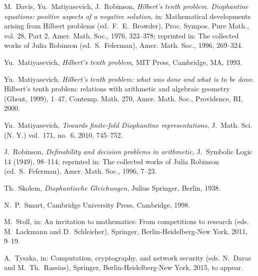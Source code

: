 \documentclass[conference]{IEEEtran}
\begin{document}
\begin{thebibliography}{11}

\mbox{M. Davis}, \mbox{Yu. Matiyasevich}, \mbox{J. Robinson},
\newblock
{\em Hilbert's tenth problem. Diophantine equations: positive aspects of a negative solution,}
in: Mathematical developments arising from Hilbert problems (ed.~F.~E.~Browder),
\newblock
Proc. Sympos. Pure Math., vol. 28, Part 2, Amer. Math. Soc., 1976, \mbox{323--378};
\newblock
reprinted in: The collected works of Julia Robinson (ed.~S.~Feferman), Amer. Math. Soc., 1996, \mbox{269--324}.

\mbox{Yu. Matiyasevich},
\newblock
{\em Hilbert's tenth problem,}
\newblock
MIT Press, Cambridge, MA, 1993.

\mbox{Yu. Matiyasevich},
\newblock
{\em Hilbert's tenth problem: what was done and what is to be done.}
\newblock
Hilbert's tenth problem: relations with arithmetic and algebraic geometry (Ghent, 1999), \mbox{1--47},
\newblock
Contemp. Math. 270, Amer. Math. Soc., Providence, RI, 2000.

\mbox{Yu. Matiyasevich},
\newblock
{\em Towards \mbox{finite-fold} Diophantine representations,}
\newblock
J.~Math. Sci. (N. Y.) \mbox{vol. 171}, \mbox{no. 6}, 2010, \mbox{745--752}.

\mbox{J. Robinson},
\newblock
{\em Definability and decision problems in arithmetic,}
\newblock
J.~Symbolic Logic 14 (1949), \mbox{98--114};
\newblock
reprinted in: The collected works of Julia Robinson (ed.~S.~Feferman),
Amer. Math. Soc., 1996, \mbox{7--23}.

\mbox{Th. Skolem},
\newblock
{\em Diophantische Gleichungen},
\newblock
Julius Springer, Berlin, 1938.

\mbox{N. P. Smart},
\newblock Cambridge University Press, Cambridge, 1998.

\mbox{M. Stoll},
in: An invitation to mathematics: From competitions to research (eds. M.~Lackmann and D.~Schleicher),
\newblock
Springer, Berlin-Heidelberg-New York, 2011, \mbox{9--19}.

\mbox{A. Tyszka},
in: Computation, cryptography, and network security (eds. N.~Daras and M.~Th.~Rassias),
Springer, Berlin-Heidelberg-New York, 2015, to appear.


\end{thebibliography}
\end{document}
